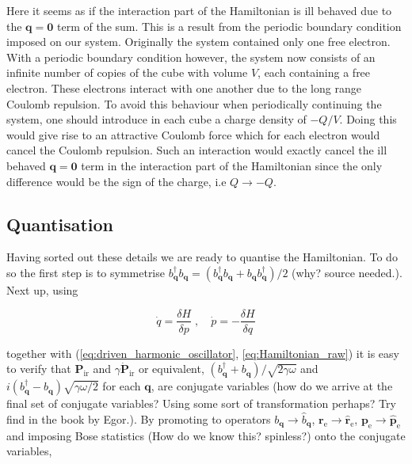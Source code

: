 \documentclass[12pt]{report}
\renewcommand{\vec}[1]{\boldsymbol{\mathbf{#1}}}                        %
\newcommand{\question}[1]{\textcolor{question}{#1}}
\begin{document}
Here it seems as if the interaction part of the Hamiltonian is ill behaved due to the $ \vec q = \vec 0 $ term of the sum. This is a result from the periodic boundary condition imposed on our system. Originally the system contained only one free electron. With a periodic boundary condition however, the system now consists of an infinite number of copies of the cube with volume $ V $, each containing a free electron. These electrons interact with one another due to the long range Coulomb repulsion. To avoid this behaviour when periodically continuing the system, one should introduce in each cube a charge density of $ - Q/V $. Doing this would give rise to an attractive Coulomb force which for each electron would cancel the Coulomb repulsion. Such an interaction would exactly cancel the ill behaved $ \vec q = \vec 0 $ term in the interaction part of the Hamiltonian since the only difference would be the sign of the charge, i.e $ Q \rightarrow -Q $.

\subsection{Quantisation}

Having sorted out these details we are ready to quantise the Hamiltonian. To do so the first step is to symmetrise $ b^\dagger_{\vec q} b_{\vec q} = (b^\dagger_{\vec q} b_{\vec q} + b_{\vec q} b^\dagger_{\vec q})/2 $ \question{(why? source needed.)}. Next up, using\cite{superfluidStatesOfMatter}

\begin{equation}
	\dot q = \frac{\delta H}{\delta p}
	\; , \quad
	\dot p = - \frac{\delta H}{\delta q}
\end{equation}

together with (\ref{eq:driven_harmonic_oscillator}, \ref{eq:Hamiltonian_raw}) it is easy to verify that $ \vec P_\text{ir} $ and $ \gamma \dot{ \vec P}_\text{ir} $ or equivalent, $ (b^\dagger_{\vec q} + b_{\vec q})/\sqrt{2 \gamma \omega} $ and $ i (b^\dagger_{\vec q} - b_{\vec q}) \sqrt{\gamma \omega / 2} $ for each $ \vec q $, are conjugate variables \question{(how do we arrive at the final set of conjugate variables? Using some sort of transformation perhaps? Try find in the book by Egor.)}.  By promoting to operators $ b_{\vec q} \rightarrow \hat b_{\vec q} $, $ \vec r_\text{e} \rightarrow \hat{\vec r}_\text{e} $, $ \vec p_\text{e} \rightarrow \hat{\vec p}_\text{e} $ and imposing Bose statistics \question{(How do we know this? spinless?)} onto the conjugate variables,
\end{document}
